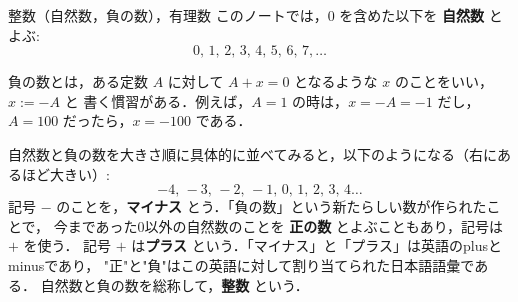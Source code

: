         \begin{mysmallsec}{整数（自然数，負の数），有理数}
            このノートでは，$0$ を含めた以下を \textbf{自然数} とよぶ:
                \begin{equation*}
                    0,\,1,\,2,\,3,\,4,\,5,\,6,\,7,\ldots
                \end{equation*}

            負の数とは，ある定数 $A$ に対して $A+x=0$ となるような $x$ のことをいい，$x:=-A$ と
            書く慣習がある．例えば，$A=1$ の時は，$x=-A=-1$ だし，$A=100$ だったら，$x=-100$ である．

            自然数と負の数を大きさ順に具体的に並べてみると，以下のようになる（右にあるほど大きい）:
                \begin{equation*}
                    -4,\,-3,\,-2,\,-1,\,0,\,1,\,2,\,3,\,4\ldots
                \end{equation*}
            記号 $-$ のことを，\textbf{マイナス} とう．「負の数」という新たらしい数が作られたことで，
            今まであった0以外の自然数のことを \textbf{正の数} とよぶこともあり，記号は $+$ を使う．
            記号 $+$ は\textbf{プラス} という．「マイナス」と「プラス」は英語のplusとminusであり，
            "正"と"負"はこの英語に対して割り当てられた日本語語彙である．
            自然数と負の数を総称して，\textbf{整数} という．


\end{mysmallsec}
